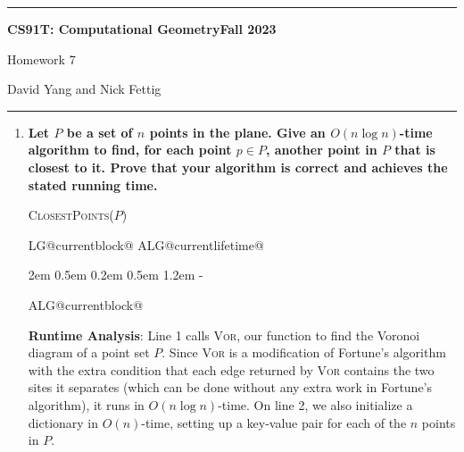 \documentclass[11pt]{article}
\makeatletter
\newlength{\continueindent}
\renewenvironment{algorithmic}[1][0]%
   {%
   \edef\ALG@numberfreq{#1}%
   \def\@currentlabel{\theALG@line}%
   \setcounter{ALG@line}{0}%
   \setcounter{ALG@rem}{0}%
   \let\\\algbreak%
   \expandafter\edef\csname ALG@currentblock@\theALG@nested\endcsname{0}%
   \expandafter\let\csname ALG@currentlifetime@\theALG@nested\endcsname\relax%
   \begin{list}%
      {\ALG@step}%
      {%
      \rightmargin\z@%
      \itemsep\z@ \itemindent\z@ \listparindent2em%
      \partopsep\z@ \parskip\z@ \parsep\z@%
      \labelsep 0.5em \topsep 0.2em%
      \ifthenelse{\equal{#1}{0}}%
         {\labelwidth 0.5em}%
         {\labelwidth 1.2em}%
       \leftmargin\labelwidth \addtolength{\leftmargin}{\labelsep}
      \ALG@tlm\z@%
      }%
      \parshape 2 \leftmargin \linewidth \continueindent \dimexpr\linewidth-\continueindent\relax
   \setcounter{ALG@nested}{0}%
   \ALG@beginalgorithmic%
   }%
   {%
   \ALG@closeloops%
   \expandafter\ifnum\csname ALG@currentblock@\theALG@nested\endcsname=0\relax%
   \else%
      \PackageError{algorithmicx}{Some blocks are not closed!!!}{}%
   \fi%
   \ALG@endalgorithmic%
   \end{list}%
   }%
\makeatother
\begin{document}
\hrule
\begin{center}
    \textbf{CS91T: Computational Geometry}\hfill \textbf{Fall 2023}\newline

    {\Large Homework 7}

    David Yang and Nick Fettig
\end{center}

\hrule

\vspace{1em}

\begin{enumerate}
\item{\textbf{Let $P$ be a set of $n$ points in the plane. Give an $O(n\log n)$-time algorithm to find, for each point $p\in P$, another point in $P$ that is closest to it. Prove that your algorithm is correct and achieves the stated running time.}}

\begin{minipage}[t]{0.9\textwidth}
    \begin{algorithm}[H]
    \caption{\textsc{ClosestPoints}($P$)}
    \begin{algorithmic}[1]
        \footnotemark
            \EndIf
            \EndIf
        \EndFor
    \end{algorithmic}
    \end{algorithm}
\end{minipage}



\vspace{1em}

\textbf{Runtime Analysis}: Line 1 calls \textsc{Vor}, our function to find the Voronoi diagram of a point set $P$. Since \textsc{Vor} is a modification of Fortune's algorithm with the extra condition that each edge returned by \textsc{Vor} contains the two sites it separates (which can be done without any extra work in Fortune's algorithm), it runs in $O(n\log n)$-time. On line 2, we also initialize a dictionary in $O(n)$-time, setting up a key-value pair for each of the $n$ points in $P$. \\


\end{enumerate}
\end{document}
